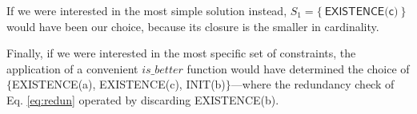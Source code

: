 \begin{example}
If we were interested in the most simple solution instead, $S_1=\{\ \textsf{EXISTENCE(c)}\ \}$ would have been our choice, because its closure is the smaller in cardinality.

Finally, if we were interested in the most specific set of constraints, the application of a convenient ${is\_better}$ function would have determined the choice of $\{$\textsf{EXISTENCE(a), EXISTENCE(c), INIT(b)}$\}$---where the redundancy check of Eq. \eqref{eq:redun} operated by discarding \textsf{EXISTENCE(b)}. 
\end{example}

%
%

%

%


%
%
%
%



